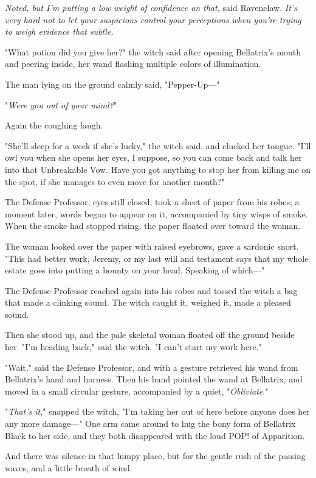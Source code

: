 \emph{Noted, but I'm putting a low weight of confidence on that,} said
Ravenclaw. \emph{It's very hard not to let your suspicions control your
perceptions when you're trying to weigh evidence that subtle.}

"What potion did you give her?" the witch said after opening Bellatrix's mouth
and peering inside, her wand flashing multiple colors of illumination.

The man lying on the ground calmly said, "Pepper-Up---"

"\emph{Were you out of your mind?}"

Again the coughing laugh.

"She'll sleep for a week if she's lucky," the witch said, and clucked her
tongue. "I'll owl you when she opens her eyes, I suppose, so you can come back
and talk her into that Unbreakable Vow. Have you got anything to stop her from
killing me on the spot, if she manages to even move for another month?"

The Defense Professor, eyes still closed, took a sheet of paper from his robes;
a moment later, words began to appear on it, accompanied by tiny wisps of
smoke. When the smoke had stopped rising, the paper floated over toward the
woman.

The woman looked over the paper with raised eyebrows, gave a sardonic snort.
"This had better work, Jeremy, or my last will and testament says that my whole
estate goes into putting a bounty on your head. Speaking of which---"

The Defense Professor reached again into his robes and tossed the witch a bag
that made a clinking sound. The witch caught it, weighed it, made a pleased
sound.

Then she stood up, and the pale skeletal woman floated off the ground beside
her. "I'm heading back," said the witch. "I can't start my work here."

"Wait," said the Defense Professor, and with a gesture retrieved his wand from
Bellatrix's hand and harness. Then his hand pointed the wand at Bellatrix, and
moved in a small circular gesture, accompanied by a quiet, "\emph{Obliviate}."

"\emph{That's it}," snapped the witch, "I'm taking her out of here before
anyone does her any more damage---" One arm came around to hug the bony form of
Bellatrix Black to her side, and they both disappeared with the loud POP! of
Apparition.

And there was silence in that lumpy place, but for the gentle rush of the
passing waves, and a little breath of wind.

